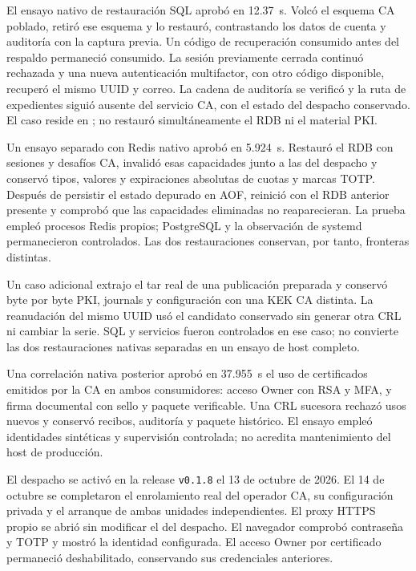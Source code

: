 El ensayo nativo de restauraci\'on SQL aprob\'o en 12.37~s. Volc\'o el esquema
CA poblado, retir\'o ese esquema y lo restaur\'o, contrastando los datos de cuenta
y auditor\'ia con la captura previa. Un c\'odigo de recuperaci\'on consumido antes
del respaldo permaneci\'o consumido. La sesi\'on previamente cerrada continu\'o
rechazada y una nueva autenticaci\'on multifactor, con otro c\'odigo disponible,
recuper\'o el mismo UUID y correo. La cadena de auditor\'ia se verific\'o y la ruta
de expedientes sigui\'o ausente del servicio CA, con el estado del despacho
conservado. El caso reside en ;
no restaur\'o simult\'aneamente el RDB ni el material PKI.

Un ensayo separado con Redis nativo aprob\'o en 5.924~s. Restaur\'o el RDB con
sesiones y desaf\'ios CA, invalid\'o esas capacidades junto a las del despacho y
conserv\'o tipos, valores y expiraciones absolutas de cuotas y marcas TOTP.
Despu\'es de persistir el estado depurado en AOF, reinici\'o con el RDB anterior
presente y comprob\'o que las capacidades eliminadas no reaparecieran. La prueba
 emple\'o
procesos Redis propios; PostgreSQL y la observaci\'on de systemd permanecieron
controlados. Las dos restauraciones conservan, por tanto, fronteras distintas.

Un caso adicional extrajo el tar real de una publicaci\'on preparada y
conserv\'o byte por byte PKI, journals y configuraci\'on con una KEK CA distinta.
La reanudaci\'on del mismo UUID us\'o el candidato conservado sin generar otra
CRL ni cambiar la serie. SQL y servicios fueron controlados en ese caso; no
convierte las dos restauraciones nativas separadas en un ensayo de host completo.

Una correlaci\'on nativa posterior aprob\'o en 37.955~s el uso de certificados
emitidos por la CA en ambos consumidores: acceso Owner con RSA y MFA, y firma
documental con sello y paquete verificable. Una CRL sucesora rechaz\'o usos
nuevos y conserv\'o recibos, auditor\'ia y paquete hist\'orico. El ensayo emple\'o
identidades sint\'eticas y supervisi\'on controlada; no acredita mantenimiento
del host de producci\'on.

El despacho se activ\'o en la release \texttt{v0.1.8} el 13 de octubre de 2026.
El 14 de octubre se completaron el enrolamiento real del operador CA, su
configuraci\'on privada y el arranque de ambas unidades independientes. El proxy
HTTPS propio se abri\'o sin modificar el del despacho. El navegador comprob\'o
contrase\~na y TOTP y mostr\'o la identidad configurada. El acceso Owner por
certificado permaneci\'o deshabilitado, conservando sus credenciales anteriores.


